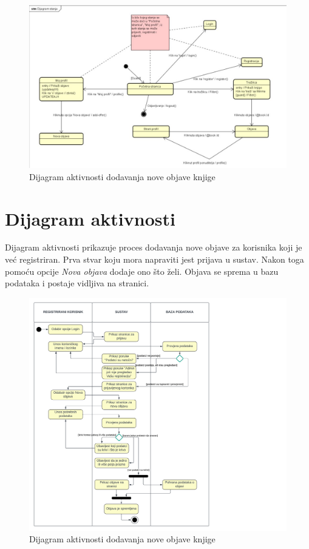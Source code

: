            		\begin{figure}[h]
				\centering
				\includegraphics[width = \textwidth]{slike/dijagram_stanja.jpg}
				\caption{Dijagram aktivnosti dodavanja nove objave knjige}
				\label{fig:nova-knjiga}
			\end{figure}
			
			\eject 
			
		
		\section{Dijagram aktivnosti}
		
			\raggedright{Dijagram aktivnosti prikazuje proces dodavanja nove objave za korisnika koji je već registriran. Prva stvar koju mora napraviti jest prijava u sustav. Nakon toga pomoću opcije \textit{Nova objava} dodaje ono što želi. Objava se sprema u bazu podataka i postaje vidljiva na stranici.}\\
			
			\begin{figure}[h]
				\centering
				\includegraphics[width = \textwidth]{slike/dijagram_akt.PNG}
				\caption{Dijagram aktivnosti dodavanja nove objave knjige}
				\label{fig:aktivnosti}
			\end{figure}
			\eject
			
